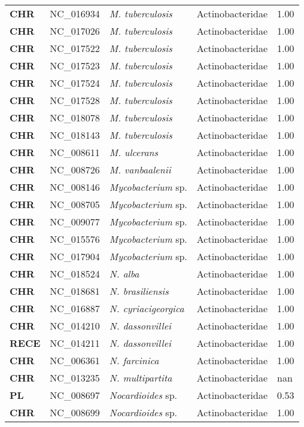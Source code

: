 \begin{adjustwidth}{-3cm}{2cm}
{\begin{supertabular}{>{\bfseries}l|p{0.1\textwidth}p{0.14\textwidth}l|l}
CHR & NC\_016934 & \textit{M. tuberculosis} & Actinobacteridae & 1.00\\
CHR & NC\_017026 & \textit{M. tuberculosis} & Actinobacteridae & 1.00\\
CHR & NC\_017522 & \textit{M. tuberculosis} & Actinobacteridae & 1.00\\
CHR & NC\_017523 & \textit{M. tuberculosis} & Actinobacteridae & 1.00\\
CHR & NC\_017524 & \textit{M. tuberculosis} & Actinobacteridae & 1.00\\
CHR & NC\_017528 & \textit{M. tuberculosis} & Actinobacteridae & 1.00\\
CHR & NC\_018078 & \textit{M. tuberculosis} & Actinobacteridae & 1.00\\
CHR & NC\_018143 & \textit{M. tuberculosis} & Actinobacteridae & 1.00\\
CHR & NC\_008611 & \textit{M. ulcerans} & Actinobacteridae & 1.00\\
CHR & NC\_008726 & \textit{M. vanbaalenii} & Actinobacteridae & 1.00\\
CHR & NC\_008146 & \textit{Mycobacterium} sp. & Actinobacteridae & 1.00\\
CHR & NC\_008705 & \textit{Mycobacterium} sp. & Actinobacteridae & 1.00\\
CHR & NC\_009077 & \textit{Mycobacterium} sp. & Actinobacteridae & 1.00\\
CHR & NC\_015576 & \textit{Mycobacterium} sp. & Actinobacteridae & 1.00\\
CHR & NC\_017904 & \textit{Mycobacterium} sp. & Actinobacteridae & 1.00\\
CHR & NC\_018524 & \textit{N. alba} & Actinobacteridae & 1.00\\
CHR & NC\_018681 & \textit{N. brasiliensis} & Actinobacteridae & 1.00\\
CHR & NC\_016887 & \textit{N. cyriacigeorgica} & Actinobacteridae & 1.00\\
CHR & NC\_014210 & \textit{N. dassonvillei} & Actinobacteridae & 1.00\\
RECE & NC\_014211 & \textit{N. dassonvillei} & Actinobacteridae & 1.00\\
CHR & NC\_006361 & \textit{N. farcinica} & Actinobacteridae & 1.00\\
CHR & NC\_013235 & \textit{N. multipartita} & Actinobacteridae & nan\\
PL & NC\_008697 & \textit{Nocardioides} sp. & Actinobacteridae & 0.53\\
CHR & NC\_008699 & \textit{Nocardioides} sp. & Actinobacteridae & 1.00\\

\end{supertabular}}
\end{adjustwidth}
